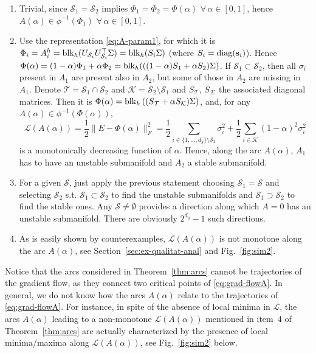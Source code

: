 \documentclass{article}
\makeatletter
\renewenvironment{proof}[1][\proofname]{
  \par\pushQED{\qed}\normalfont
  \topsep6\p@\@plus6\p@\relax
  \trivlist\item[\hskip\labelsep\bfseries#1\@addpunct{.}]
  \ignorespaces
}{
  \popQED\endtrivlist\@endpefalse
}
\def\diag{{\rm diag}}
\def\block{{\rm blk}}
\newcommand{\1}{\mathds{1}}
\newcommand{\benu}{\begin{enumerate}}
\newcommand{\eenu}{\end{enumerate}}
\makeatother
\begin{document}
\begin{proof}
\benu
\item Trivial, since $ \mathcal{S}_1 = \mathcal{S}_2$ implies $ \Phi_1 = \Phi_2 = \Phi(\alpha) $ $ \forall \, \alpha \in [0,1]$, hence $ A(\alpha) \in \phi^{-1} (\Phi_1)$ $ \forall \, \alpha \in [0,1]$. 

\item Use the representation \eqref{eq:A-param1}, for which it is $ \Phi_i = A_i^h= \block_h(U_{\mathcal{S}_i} U_{\mathcal{S}_i}^\top \Sigma) = \block_h( S_i \Sigma) $ (where $ S_i = \diag(\mathbf{s}_i)$). Hence $ \Phi(\alpha) = (1-\alpha) \Phi_1 + \alpha \Phi_2 = \block_h( ((1-\alpha) S_1 + \alpha S_2 ) \Sigma)$. If $ \mathcal{S}_1 \subset \mathcal{S}_2 $, then all $ \sigma_i $ present in $A_1 $ are present also in $A_2$, but some of those in $A_2 $ are missing in $A_1$. Denote $ \mathcal{T} = \mathcal{S}_1 \cap \mathcal{S}_2 $ and $ \mathcal{K} = \mathcal{S}_2 \setminus \mathcal{S}_1 $ and $ S_\mathcal{T}$, $ S_\mathcal{K} $ the associated diagonal matrices.
Then it is $ \Phi(\alpha) = \block_h \left( (S_\mathcal{T} + \alpha S_\mathcal{K} ) \Sigma \right)$, and, for any $ A(\alpha ) \in \phi^{-1}(\Phi(\alpha)) $, 
$$ 
\mathcal{L}(A(\alpha) ) = \frac{1}{2} \| E - \Phi(\alpha) \|_F^2 = \frac{1}{2}\sum_{i\in \{1, \ldots, d_y\} \setminus \mathcal{S}_2}  \sigma_i^2 + \frac{1}{2}\sum_{i\in \mathcal{K}} (1-\alpha)^2 \sigma_i^2 
$$ 
is a monotonically decreasing function of $ \alpha$. Hence, along the arc $ A(\alpha)$, $A_1 $ has to have an unstable submanifold and $ A_2 $ a stable submanifold. 

\item For a given $ \mathcal{S}$, just apply the previous statement choosing $ \mathcal{S}_1 = \mathcal{S} $ and selecting $\mathcal{S}_2 $ s.t. $ \mathcal{S}_1 \subset \mathcal{S}_2 $ to find the unstable submanifolds and $ \mathcal{S}_1 \supset \mathcal{S}_2 $ to find the stable ones.
Any $ \mathcal{S}\neq \emptyset $ provides a direction along which $A = 0 $ has an unstable submanifold. There are obviously $ 2^{d_y}-1 $ such directions.

\item As is easily shown by counterexamples,  $ \mathcal{L}(A(\alpha)) $ is not monotone along the arc $ A(\alpha)$, see Section~\ref{sec:ex-qualitat-anal} and Fig.~\ref{fig:sim2}. 
\eenu
\end{proof}



Notice that the arcs considered in Theorem~\ref{thm:arcs} cannot be trajectories of the gradient flow, as they connect two critical points of \eqref{eq:grad-flowA}.
In general, we do not know how the arcs $A(\alpha)$ relate to the trajectories of \eqref{eq:grad-flowA}. 
For instance, in spite of the absence of local minima in $ \mathcal{L}$, the arcs $ A(\alpha)$ leading to a non-monotone  $ \mathcal{L}(A(\alpha)) $ mentioned in item~4 of Theorem~\ref{thm:arcs} are actually characterized by the presence of local minima/maxima along $ \mathcal{L}(A(\alpha)) $, see Fig.~\ref{fig:sim2} below.
\end{document}
